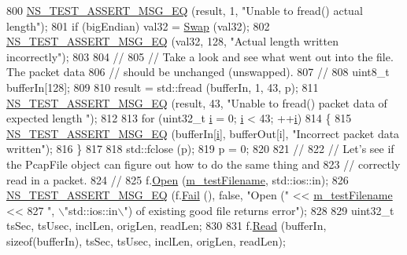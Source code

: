 \begin{DoxyCode}
800   \hyperlink{group__testing_ga2a9d78cffb3db8e867c35fff0b698cf5}{NS\_TEST\_ASSERT\_MSG\_EQ} (result, 1, \textcolor{stringliteral}{"Unable to fread() actual length"});
801   \textcolor{keywordflow}{if} (bigEndian) val32 = \hyperlink{pcap-file-test-suite_8cc_a9baeceaeb66adfc7bddae33a81ad8fa7}{Swap} (val32);
802   \hyperlink{group__testing_ga2a9d78cffb3db8e867c35fff0b698cf5}{NS\_TEST\_ASSERT\_MSG\_EQ} (val32, 128, \textcolor{stringliteral}{"Actual length written incorrectly"});
803 
804   \textcolor{comment}{//}
805   \textcolor{comment}{// Take a look and see what went out into the file.  The packet data}
806   \textcolor{comment}{// should be unchanged (unswapped).}
807   \textcolor{comment}{//}
808   uint8\_t bufferIn[128];
809 
810   result = std::fread (bufferIn, 1, 43, p);
811   \hyperlink{group__testing_ga2a9d78cffb3db8e867c35fff0b698cf5}{NS\_TEST\_ASSERT\_MSG\_EQ} (result, 43, \textcolor{stringliteral}{"Unable to fread() packet data of expected length
      "});
812 
813   \textcolor{keywordflow}{for} (uint32\_t \hyperlink{bernuolliDistribution_8m_a6f6ccfcf58b31cb6412107d9d5281426}{i} = 0; \hyperlink{bernuolliDistribution_8m_a6f6ccfcf58b31cb6412107d9d5281426}{i} < 43; ++\hyperlink{bernuolliDistribution_8m_a6f6ccfcf58b31cb6412107d9d5281426}{i})
814     \{
815       \hyperlink{group__testing_ga2a9d78cffb3db8e867c35fff0b698cf5}{NS\_TEST\_ASSERT\_MSG\_EQ} (bufferIn[\hyperlink{bernuolliDistribution_8m_a6f6ccfcf58b31cb6412107d9d5281426}{i}], bufferOut[i], \textcolor{stringliteral}{"Incorrect packet data
       written"});
816     \}
817 
818   std::fclose (p);
819   p = 0;
820 
821   \textcolor{comment}{//}
822   \textcolor{comment}{// Let's see if the PcapFile object can figure out how to do the same thing and}
823   \textcolor{comment}{// correctly read in a packet.}
824   \textcolor{comment}{//}
825   f.\hyperlink{classns3_1_1PcapFile_a064e8494e28e823d0bb4e40549f9f483}{Open} (\hyperlink{classRecordHeaderTestCase_a120cda070e5262333c795ce77359528e}{m\_testFilename}, std::ios::in);
826   \hyperlink{group__testing_ga2a9d78cffb3db8e867c35fff0b698cf5}{NS\_TEST\_ASSERT\_MSG\_EQ} (f.\hyperlink{classns3_1_1PcapFile_a2e00aa080890a0c9c3e9f5bd2d6c21d5}{Fail} (), \textcolor{keyword}{false}, \textcolor{stringliteral}{"Open ("} << 
      \hyperlink{classRecordHeaderTestCase_a120cda070e5262333c795ce77359528e}{m\_testFilename} << 
827                          \textcolor{stringliteral}{", \(\backslash\)"std::ios::in\(\backslash\)") of existing good file returns error"});
828 
829   uint32\_t tsSec, tsUsec, inclLen, origLen, readLen;
830 
831   f.\hyperlink{classns3_1_1PcapFile_a18c5045735408fe45a8cbc9e6b34a4fb}{Read} (bufferIn, \textcolor{keyword}{sizeof}(bufferIn), tsSec, tsUsec, inclLen, origLen, readLen);

\end{DoxyCode}
